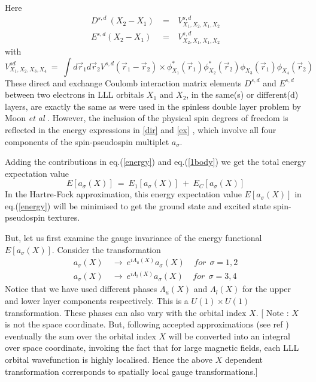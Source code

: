 Here 
\begin{eqnarray} D^{s,d} \ (X_{2}-X_{1}) \ &=& \  V^{s,d}_{X_1 , X_2 , X_1 , X_2} 
\nonumber \\ 
E^{s,d } (X_{2}-X_{1}) \ &=& \  V^{s,d}_{X_2 , X_1, X_1 , X_2} \end{eqnarray}
with
\begin{equation} V^{s d}
_{X_{1},X_{2},X_{3},X_{4}} \ = \ \int d\vec{r}_{1} d\vec{r}_{2}
V^{s,d}
(\vec{r}_{1} - \vec{r}_{2}) \times \phi^{\ast}_{X_{1}}(\vec{r}_{1})
\phi^{\ast}_{X_{2}}(\vec{r}_{2}) \phi_{X_{3}}(\vec{r}_{1})
\phi_{X_{4}}(\vec{r}_{2}) \end{equation}
These direct and exchange Coulomb interaction matrix elements $D^{s,d}$ 
and $E^{s,d}$ between two
electrons in LLL orbitals $X_1$ and $X_2$, in the same(s) or different(d)
layers, are
exactly the same as were used in the spinless double layer problem by
Moon {\sl et al} \cite{Moon}. However, the inclusion
of the physical spin degrees
of freedom is reflected in the energy expressions in \ref{dir} 
and \ref{ex} , which involve all four components of the spin-pseudospin 
multiplet $a_{\sigma}$.

Adding the contributions in eq.(\ref{energy}) and eq.(\ref{1body})
we get the total energy expectation value
\begin{equation} E [ a_{\sigma}(X) ] \ = \ E_{1} [ a_{\sigma}(X) ] \ + \ 
E_{C} [ a_{\sigma}(X) ] \label{Etot} \end{equation}
In the Hartre-Fock approximation, this energy expectation value
$E [ a_{\sigma}(X) ]$ in eq.(\ref{energy}) will be minimised to
get the ground state and excited state spin-pseudospin textures.

But, let us first examine the gauge invariance of the 
energy functional $E [ a_{\sigma}(X) ]$. Consider the transformation
\begin{eqnarray} a_{\sigma}(X) \ &\rightarrow \ e^{i \Lambda_{u}(X)}
a_{\sigma}(X) \ \ \ \ \ for \ \  \sigma =1,2 \nonumber \\
a_{\sigma}(X) \ &\rightarrow \ e^{i \Lambda_{l}(X)}
a_{\sigma}(X) \ \ \ \ \ for \ \ \sigma =3,4 \label{gtr} \end{eqnarray}
Notice that we have used different phases $\Lambda_{u}(X)$
and $\Lambda_{l}(X)$ for the upper and lower layer components 
respectively. This is a $U(1) \times U(1)$ transformation. These 
phases can also vary with the orbital index $X$.
[ Note : $X$ is not the space coordinate. But, following
accepted approximations (see ref \cite{Moon}) eventually the
sum over the orbital index $X$ will be converted into an
integral over space coordinate, invoking the fact that for large magnetic
fields, each LLL orbital wavefunction is highly localised. 
Hence the above $X$ dependent
transformation corresponds to spatially local gauge
transformations.]

